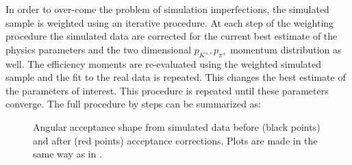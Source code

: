 In order to over-come the problem of simulation imperfections, the simulated sample is weighted using an iterative procedure.
At each step of the weighting procedure the simulated data are corrected for the current best estimate of the physics
parameters and the two dimensional $p_{K^{\pm}},p_{\pi^{\mp}}$ momentum distribution as well.
The efficiency moments are re-evaluated using the weighted simulated sample and the fit to the real data is repeated.
This changes the best estimate of the parameters of interest. This procedure is repeated until these parameters
converge. The full procedure by steps can be summarized as:

\begin{figure}[!t]
  \centering
  \begin{subfigure}{0.49\textwidth}
    \scalebox{1.15}{}
    \caption{}
    \label{angAccCor_ctk}
  \end{subfigure}%
  \hfill%
  \begin{subfigure}{0.49\textwidth}
    \scalebox{1.15}{}
    \caption{}
    \label{angAccCorr_ctl}
  \end{subfigure}
  \vspace*{0.02\textwidth}
  \begin{subfigure}{0.49\textwidth}
    \scalebox{1.15}{}
    \caption{}
    \label{angAccCorr_phi}
  \end{subfigure}
  \caption{Angular acceptance shape from simulated data before (black points) and after (red points) acceptance corrections.
           Plots are made in the same way as in .}
  \label{angAggCorrections}
\end{figure}


